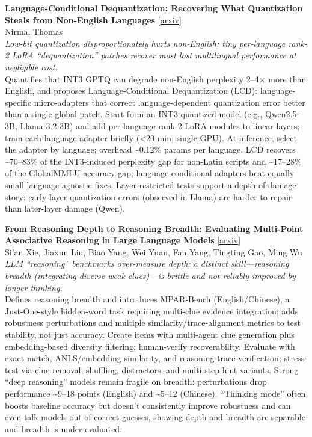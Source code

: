 \documentclass[12pt,letterpaper]{article}
\begin{document}
\medskip

{\small\textbf{Language-Conditional Dequantization: Recovering What Quantization Steals from Non-English Languages}} {\scriptsize[\href{https://arxiv.org/abs/2608.11786}{arxiv}]}\\
{\scriptsize Nirmal Thomas}\\

{\small\textit{Low-bit quantization disproportionately hurts non-English; tiny per-language rank-2 LoRA ``dequantization'' patches recover most lost multilingual performance at negligible cost.}}\\[1pt]
{\footnotesize Quantifies that INT3 GPTQ can degrade non-English perplexity 2--4× more than English, and proposes Language-Conditional Dequantization (LCD): language-specific micro-adapters that correct language-dependent quantization error better than a single global patch. Start from an INT3-quantized model (e.g., Qwen2.5-3B, Llama-3.2-3B) and add per-language rank-2 LoRA modules to linear layers; train each language adapter briefly (<20 min, single GPU). At inference, select the adapter by language; overhead \textasciitilde{}0.12\% params per language. LCD recovers \textasciitilde{}70--83\% of the INT3-induced perplexity gap for non-Latin scripts and \textasciitilde{}17--28\% of the GlobalMMLU accuracy gap; language-conditional adapters beat equally small language-agnostic fixes. Layer-restricted tests support a depth-of-damage story: early-layer quantization errors (observed in Llama) are harder to repair than later-layer damage (Qwen).}

\medskip

{\small\textbf{From Reasoning Depth to Reasoning Breadth: Evaluating Multi-Point Associative Reasoning in Large Language Models}} {\scriptsize[\href{https://arxiv.org/abs/2608.10444}{arxiv}]}\\
{\scriptsize Si'an Xie, Jiaxun Liu, Biao Yang, Wei Yuan, Fan Yang, Tingting Gao, Ming Wu}\\

{\small\textit{LLM ``reasoning'' benchmarks over-measure depth; a distinct skill---reasoning breadth (integrating diverse weak clues)---is brittle and not reliably improved by longer thinking.}}\\[1pt]
{\footnotesize Defines reasoning breadth and introduces MPAR-Bench (English/Chinese), a Just-One-style hidden-word task requiring multi-clue evidence integration; adds robustness perturbations and multiple similarity/trace-alignment metrics to test stability, not just accuracy. Create items with multi-agent clue generation plus embedding-based diversity filtering; human-verify recoverability. Evaluate with exact match, ANLS/embedding similarity, and reasoning-trace verification; stress-test via clue removal, shuffling, distractors, and multi-step hint variants. Strong ``deep reasoning'' models remain fragile on breadth: perturbations drop performance \textasciitilde{}9--18 points (English) and \textasciitilde{}5--12 (Chinese). ``Thinking mode'' often boosts baseline accuracy but doesn't consistently improve robustness and can even talk models out of correct guesses, showing depth and breadth are separable and breadth is under-evaluated.}
\end{document}
